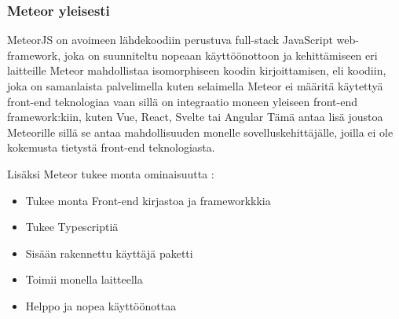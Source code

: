 



\subsubsection{Meteor yleisesti}








MeteorJS on avoimeen lähdekoodiin perustuva full-stack JavaScript web-framework, joka on 
suunniteltu nopeaan käyttöönottoon ja kehittämiseen eri laitteille
Meteor mahdollistaa isomorphiseen koodin kirjoittamisen, eli koodiin, joka on samanlaista palvelimella kuten selaimella %
Meteor ei määritä käytettyä front-end teknologiaa vaan sillä on integraatio moneen yleiseen front-end framework:kiin, kuten Vue, React, Svelte tai Angular
Tämä antaa lisä joustoa Meteorille sillä se antaa mahdollisuuden monelle sovelluskehittäjälle, joilla ei ole kokemusta tietystä front-end teknologiasta.\\
\medskip



    

Lisäksi Meteor tukee monta ominaisuutta :
\begin{itemize}
    \item Tukee monta Front-end kirjastoa ja frameworkkkia
    \item Tukee Typescriptiä
    \item Sisään rakennettu käyttäjä paketti
    \item Toimii monella laitteella
    \item Helppo ja nopea käyttöönottaa 
\end{itemize}
\medskip



